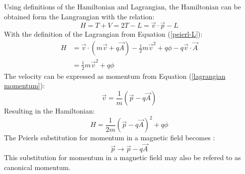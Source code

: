 			Using definitions of the Hamiltonian and Lagrangian, the Hamiltonian can be obtained form the Langrangian with the relation:
			\begin{equation}
				H=T+V=2T-L=\vec{v}\cdot\vec{p}-L
			\end{equation}
			With the definition of the Lagrangian from Equation (\ref{peierl-L}):
			\begin{align}
				H&=\vec{v}\cdot\left(m\vec{v}+q\vec{A}\right)-\frac{1}{2}m\vec{v}^{2}+q\phi-q\vec{v}\cdot\vec{A}\\
				&=\frac{1}{2}m\vec{v}^{2}+q\phi
			\end{align}
			The velocity can be expressed as momentum from Equation (\ref{lagrangian momentum}):
			\begin{equation}
				\vec{v}=\frac{1}{m}\left(\vec{p}-q\vec{A}\right)
			\end{equation}
			Resulting in the Hamiltonian:
			\begin{equation}
				H=\frac{1}{2m}\left(\vec{p}-q\vec{A}\right)^{2}+q\phi
			\end{equation}
			The Peierls substitution for momentum in a magnetic field becomes \cite{b39}:
			\begin{equation}
				\vec{p}\rightarrow \vec{p}-q\vec{A}
			\end{equation}
			This substitution for momentum in a magnetic field may also be refered to as canonical momentum.
